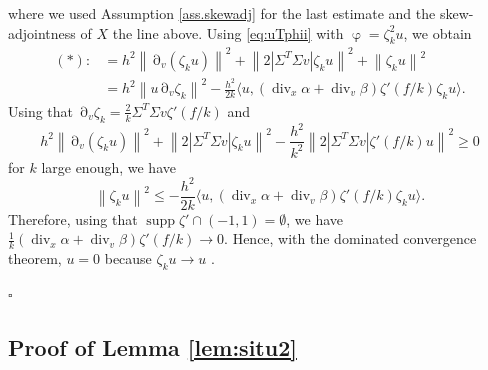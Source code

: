 \documentclass[12pt]{amsart}
\newcommand{\supp}{\operatorname{supp}}
\renewcommand{\div}{\operatorname{div}}
\def\<{\langle}
\def\>{\rangle}
\newcommand{\ep}{\hfill $\square$}
\numberwithin{equation}{section}
\numberwithin{figure}{section}
\DeclareMathOperator{\p}{\partial}
\DeclareMathOperator{\phii}{\varphi}
\newcommand{\vvert}[1]{\left\lVert#1\right\rVert}
\begin{document}
where we used Assumption \ref{ass.skewadj} for the last estimate and the skew-adjointness of $X$ the line above. Using \eqref{eq:uTphii} with $\phii = \zeta_k^2u$, we obtain
\begin{equation*}
\begin{split}
    (\ast):&= h^2\vvert{\p_v(\zeta_k u)}^2 + \vvert{2|\Sigma^T\Sigma v|\zeta_k u}^2 + \vvert{\zeta_k u}^2\\
    &= h^2\vvert{u\p_v\zeta_k}^2 - \frac{h^2}{2k}\<u,(\div_x\alpha + \div_v\beta)\zeta'(f/k)\zeta_k u\>.
\end{split}
\end{equation*}
Using that $\p_v\zeta_k = \frac2k\Sigma^T\Sigma v\zeta'(f/k)$ and
\begin{equation*}
h^2\vvert{\p_v(\zeta_k u)}^2 + \vvert{2|\Sigma^T\Sigma v|\zeta_k u}^2-\frac{h^2}{k^2}\vvert{2|\Sigma^T\Sigma v|\zeta'(f/k)u}^2\geq0
\end{equation*}
for $k$ large enough, we %
have
\begin{equation*}
\vvert{\zeta_k u}^2 \leq - \frac{h^2}{2k}\<u,(\div_x\alpha + \div_v\beta)\zeta'(f/k)\zeta_k u\>.
\end{equation*}
Therefore, using that $\supp\zeta' \cap (-1,1) = \emptyset$, we have $\frac1k(\div_x\alpha + \div_v\beta)\zeta'(f/k)\to0$. Hence, with the dominated convergence theorem, $u=0$ because $\zeta_ku\to u$%
.

\ep










\subsection{Proof of Lemma \ref{lem:situ2}}\label{ssec:lemma}
\end{document}

